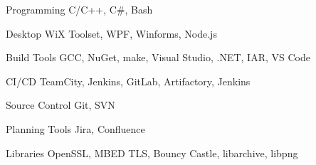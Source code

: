 

\begin{cvskills}


\cvskill
{Programming} %
{C/C++, C\#, Bash} %


\cvskill
{Desktop} %
{WiX Toolset, WPF, Winforms, Node.js} %


\cvskill
{Build Tools} %
{GCC, NuGet, make, Visual Studio, .NET, IAR, VS Code} %


\cvskill
{CI/CD} %
{TeamCity, Jenkins, GitLab, Artifactory, Jenkins} %


\cvskill
{Source Control} %
{Git, SVN} %


\cvskill
{Planning Tools} %
{Jira, Confluence} %


\cvskill
{Libraries} %
{OpenSSL, MBED TLS, Bouncy Castle, libarchive, libpng} %

\end{cvskills}